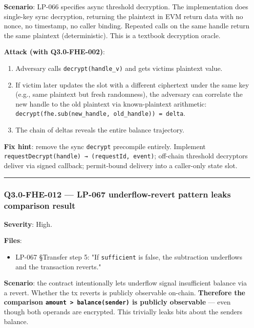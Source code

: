 \documentclass[
]{article}
\providecommand{\tightlist}{%
  \setlength{\itemsep}{0pt}\setlength{\parskip}{0pt}}
\begin{document}
\textbf{Scenario}: LP-066 specifies async threshold decryption. The
implementation does single-key sync decryption, returning the plaintext
in EVM return data with no nonce, no timestamp, no caller binding.
Repeated calls on the same handle return the same plaintext
(deterministic). This is a textbook decryption oracle.

\textbf{Attack (with Q3.0-FHE-002)}:

\begin{enumerate}
\def\labelenumi{\arabic{enumi}.}
\tightlist
\item
  Adversary calls \texttt{decrypt(handle\_v)} and gets
  victim\textquotesingle s plaintext value.
\item
  If victim later updates the slot with a different ciphertext under the
  same key (e.g., same plaintext but fresh randomness), the adversary
  can correlate the new handle to the old plaintext via known-plaintext
  arithmetic:
  \texttt{decrypt(fhe.sub(new\_handle,\ old\_handle))\ =\ delta}.
\item
  The chain of deltas reveals the entire balance trajectory.
\end{enumerate}

\textbf{Fix hint}: remove the sync \texttt{decrypt} precompile entirely.
Implement \texttt{requestDecrypt(handle)\ →\ (requestId,\ event)};
off-chain threshold decryptors deliver via signed callback; permit-bound
delivery into a caller-only state slot.

\begin{center}\rule{0.5\linewidth}{0.5pt}\end{center}

\subsubsection{Q3.0-FHE-012 --- LP-067 underflow-revert pattern leaks
comparison
result}\label{q30-fhe-012--lp-067-underflow-revert-pattern-leaks-comparison-result}

\textbf{Severity}: High.

\textbf{Files}:

\begin{itemize}
\tightlist
\item
  LP-067 §Transfer step 5: "If \texttt{sufficient} is false, the
  subtraction underflows and the transaction reverts."
\end{itemize}

\textbf{Scenario}: the contract intentionally lets underflow signal
insufficient balance via a revert. Whether the tx reverts is publicly
observable on-chain. \textbf{Therefore the comparison
\texttt{amount\ \textgreater{}\ balance(sender)} is publicly observable}
--- even though both operands are encrypted. This trivially leaks bits
about the sender\textquotesingle s balance.
\end{document}

